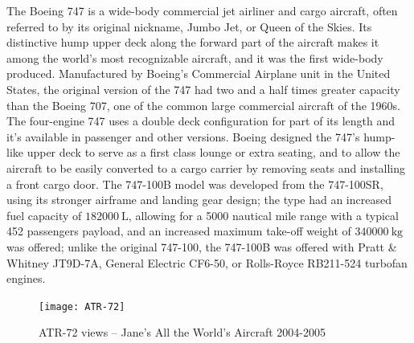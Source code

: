 \bigskip
\noindent
The Boeing 747 is a wide-body commercial jet airliner and cargo aircraft, often referred to by its original nickname, Jumbo Jet, or Queen of the Skies. Its distinctive hump upper deck along the forward part of the aircraft makes it among the world's most recognizable aircraft, and it was the first wide-body produced. Manufactured by Boeing's Commercial Airplane unit in the United States, the original version of the 747 had two and a half times greater capacity than the Boeing 707, one of the common large commercial aircraft of the 1960s. The four-engine 747 uses a double deck configuration for part of its length and it’s available in passenger and other versions. Boeing designed the 747's hump-like upper deck to serve as a first class lounge or extra seating, and to allow the aircraft to be easily converted to a cargo carrier by removing seats and installing a front cargo door. The 747-100B model was developed from the 747-100SR, using its stronger airframe and landing gear design; the type had an increased fuel capacity of $\SI{182000}{\liter}$, allowing for a 5000 nautical mile range with a typical 452 passengers payload, and an increased maximum take-off weight of $\SI{340000}{\kilogram}$ was offered; unlike the original 747-100, the 747-100B was offered with Pratt \& Whitney JT9D-7A, General Electric CF6-50, or Rolls-Royce RB211-524 turbofan engines.
%
\begin{figure}[H]
\centering
\texttt{[image: ATR-72]}
\caption{ATR-72 views – Jane's All the World's Aircraft 2004-2005}
\label{fig:Figure6}
\end{figure}
%
